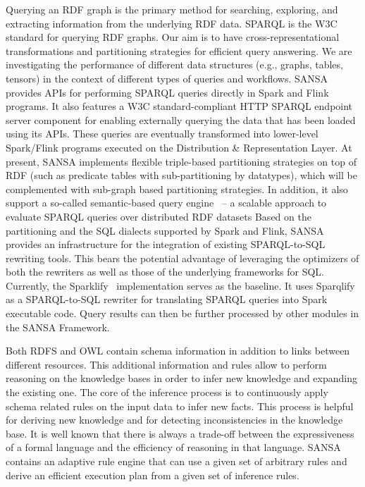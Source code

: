 Querying an \gls{RDF} graph is the primary method for searching, exploring, and extracting information from the underlying \gls{RDF} data.
\gls{SPARQL} is the \gls{W3C} standard for querying \gls{RDF} graphs.
Our aim is to have cross-representational transformations and partitioning strategies for efficient query answering. We are investigating the performance of different data structures (e.g., graphs, tables, tensors) in the context of different types of queries and workflows.
SANSA provides \gls{API}s for performing \gls{SPARQL} queries directly in Spark and Flink programs.
It also features a \gls{W3C} standard-compliant HTTP \gls{SPARQL} endpoint server component for enabling externally querying the data that has been loaded using its \gls{API}s. These queries are eventually transformed into lower-level Spark/Flink programs executed on the Distribution \& Representation Layer.
At present, SANSA implements flexible triple-based partitioning strategies on top of \gls{RDF} (such as predicate tables with sub-partitioning by datatypes), which will be complemented with sub-graph based partitioning strategies.
In addition, it also support a so-called semantic-based query engine~\cite{sejdiu-2019-sansa-semantic-based-semantics} -- a scalable approach to evaluate \gls{SPARQL} queries over distributed \gls{RDF} datasets
Based on the partitioning and the SQL dialects supported by Spark and Flink, SANSA provides an infrastructure for the integration of existing SPARQL-to-SQL rewriting tools. 
This bears the potential advantage of leveraging the optimizers of both the rewriters as well as those of the underlying frameworks for SQL.
Currently, the Sparklify~\cite{2019-sansa-sparklify-iswc} implementation serves as the baseline.
It uses Sparqlify as a SPARQL-to-SQL rewriter for translating \gls{SPARQL} queries into Spark executable code.
Query results can then be further processed by other modules in the SANSA Framework.

Both \gls{RDFS} and \gls{OWL} contain schema information in addition to links between different resources. 
This additional information and rules allow to perform reasoning on the knowledge bases in order to infer new knowledge and expanding the existing one. 
The core of the inference process is to continuously apply schema related rules on the input data to infer new facts. 
This process is helpful for deriving new knowledge and for detecting inconsistencies in the knowledge base.
It is well known that there is always a trade-off between the expressiveness of a formal language and the efficiency of reasoning in that language. 
SANSA contains an adaptive rule engine that can use a given set of arbitrary rules and derive an efficient execution plan from a given set of inference rules.

